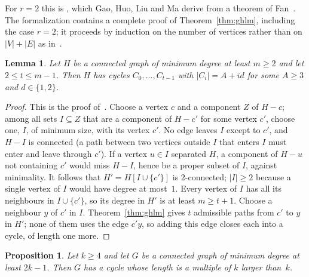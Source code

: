 \documentclass[11pt]{article}
\newtheorem{lemma}{Lemma}
\newtheorem{proposition}{Proposition}
\theoremstyle{remark}
\begin{document}
For $r=2$ this is \cite[Theorem~2.1]{ghlm}, which Gao, Huo, Liu and Ma derive
from a theorem of Fan~\cite[Theorem~2.5]{fan}. The formalization contains a
complete proof of Theorem~\ref{thm:ghlm}, including the case $r=2$; it
proceeds by induction on the number of vertices rather than on $|V|+|E|$ as
in~\cite{ghlm}.

\begin{lemma}\label{lem:progression}
Let $H$ be a connected graph of minimum degree at least $m\ge2$ and let
$2\le t\le m-1$. Then $H$ has cycles $C_0,\dots,C_{t-1}$ with $|C_i|=A+id$ for
some $A\ge3$ and $d\in\{1,2\}$.
\end{lemma}

\begin{proof}
This is the proof of~\cite[Theorem~1.3]{ghlm}. Choose a vertex $c$ and a
component $Z$ of $H-c$; among all sets $I\subseteq Z$ that are a component of
$H-c'$ for some vertex $c'$, choose one, $I$, of minimum size, with its vertex
$c'$. No edge leaves $I$ except to $c'$, and $H-I$ is connected (a path between
two vertices outside $I$ that enters $I$ must enter and leave through $c'$). If
a vertex $u\in I$ separated $H$, a component of $H-u$ not containing $c'$ would
miss $H-I$, hence be a proper subset of $I$, against minimality. It follows
that $H'=H[I\cup\{c'\}]$ is $2$-connected; $|I|\ge2$ because a single vertex
of $I$ would have degree at most~$1$. Every vertex of $I$ has all its neighbours in
$I\cup\{c'\}$, so its degree in $H'$ is at least $m\ge t+1$. Choose a neighbour
$y$ of $c'$ in $I$. Theorem~\ref{thm:ghlm} gives $t$ admissible paths from $c'$
to $y$ in $H'$; none of them uses the edge $c'y$, so adding this edge closes
each into a cycle, of length one more.
\end{proof}

\begin{proposition}\label{prop:long}
Let $k\ge4$ and let $G$ be a connected graph of minimum degree at least
$2k-1$. Then $G$ has a cycle whose length is a multiple of $k$ larger than~$k$.
\end{proposition}
\end{document}
